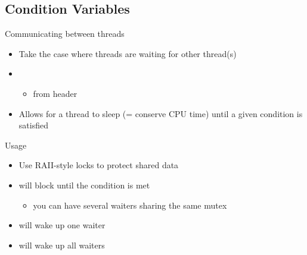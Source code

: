 \subsection[condition]{Condition Variables}

\begin{frame}[fragile]
  \begin{block}{Communicating between threads}
    \begin{itemize}
      \item Take the case where threads are waiting for other thread(s)
      \item {}
      \begin{itemize}
        \item from  header
      \end{itemize}
      \item Allows for a thread to sleep (= conserve CPU time) until a given condition is satisfied
    \end{itemize}
  \end{block}
  \pause
  \begin{block}{Usage}
    \begin{itemize}
    \item Use RAII-style locks to protect shared data
    \item {} will block until the condition is met
      \begin{itemize}
      \item you can have several waiters sharing the same mutex
      \end{itemize}
    \item {} will wake up one waiter
    \item {} will wake up all waiters
    \end{itemize}
  \end{block}
\end{frame}

